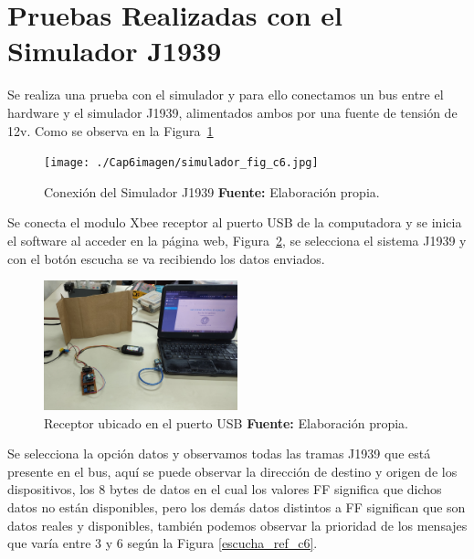 \section{Pruebas Realizadas con el Simulador J1939}
Se realiza una prueba con el simulador y para ello conectamos un bus entre el hardware y el simulador J1939, alimentados ambos por una fuente de tensión de 12v. Como se observa en la Figura~\ref{simulador_ref_c6}

\begin{figure}[H]
	\centering
	\texttt{[image: ./Cap6imagen/simulador\_fig\_c6.jpg]}
	\caption [Conexión del Simulador J1939.]{Conexión del Simulador J1939 \textbf{ Fuente:} %
		Elaboración propia.}
	\label{simulador_ref_c6} %
\end{figure}

Se conecta el modulo Xbee receptor al puerto USB de la computadora y se inicia el software al acceder en la página web, Figura~\ref{receptor_ref_c6},  se selecciona el sistema J1939 y con el botón escucha se va recibiendo los datos enviados. 


\begin{figure}[H]
	\centering
	\includegraphics[width=0.5\textwidth]{./Cap6imagen/receptor_fig_c6.jpg}
	\caption [Receptor ubicado en el puerto USB.]{Receptor ubicado en el puerto USB \textbf{ Fuente:} %
		Elaboración propia.}
	\label{receptor_ref_c6} %
\end{figure}

Se selecciona la opción datos y observamos todas las tramas J1939 que está presente en el bus, aquí se puede observar la dirección de destino y origen de los dispositivos, los 8 bytes de datos en el cual los valores FF significa que dichos datos no están disponibles, pero los demás datos distintos a FF significan que son datos reales y disponibles, también podemos observar la prioridad de los mensajes que varía entre 3 y 6 según la Figura \ref{escucha_ref_c6}.

